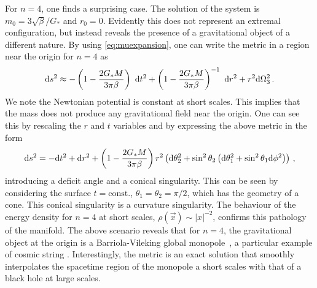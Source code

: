 For $n=4$, one finds a surprising case. The solution of the system is
$m_0=3 \sqrt{\beta}/G_*$ and $r_0=0$.
Evidently this does not represent an extremal configuration, but instead
reveals the presence of a gravitational object of a different nature.
By using \eqref{eq:muexpansion}, one can write the metric in a region 
near the origin for $n=4$ as
\begin{equation}
\mathrm{d} s^2 \approx - \left(1-\frac{2G_\ast M}{3\pi\beta}\right)\ \mathrm{d} t^2 + 
\left(1-\frac{2G_\ast M}{3\pi\beta}\right)^{-1}\ \mathrm{d} r^2 + r^2 \mathrm{d}\Omega^2_{3}\,.
\end{equation}
We note the Newtonian potential is constant at short scales. This implies
that the mass does not produce any gravitational field near the origin.
One can see this by rescaling the $r$ and $t$ variables and by expressing
the above metric in the form
\begin{equation}
\mathrm{d} s^2 = -  \mathrm{d} t^2 + 
\mathrm{d} r^2 + \left(1-\frac{2G_\ast M}{3\pi\beta}\right) r^2\left( \mathrm{d}\theta^2_2+\sin^2\theta_2\left(\mathrm{d}\theta_1^2+\sin^2\theta_1\mathrm{d} \phi^2\right)\right)\,,
\end{equation}
introducing a deficit angle and a conical singularity. This can be seen
by considering the surface $t=\mathrm{const.}$, $\theta_1=\theta_2=\pi/2$,
which has the geometry of a cone. This conical singularity is a curvature
singularity. The behaviour of the energy density for $n=4$ at short scales,
$\rho(\vec{x})\sim |x|^{-2}$, confirms this pathology of the manifold.
The above scenario reveals that for $n=4$, the gravitational object at the
origin is a Barriola-Vileking global monopole~\cite{BaV89}, \ie
a  particular example of cosmic string \cite{FIU89}. Interestingly, the
metric is an exact solution that smoothly  interpolates the spacetime
region of the monopole a short scales with that of a black hole at
large scales.

